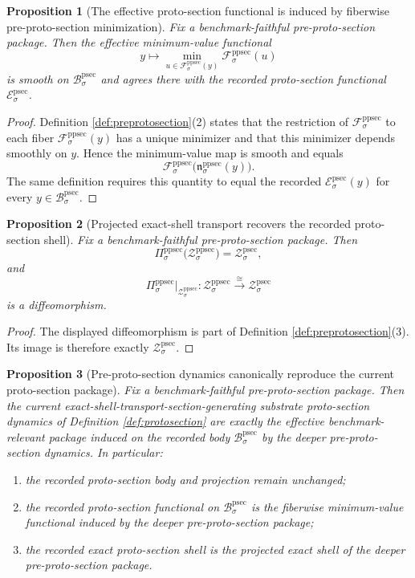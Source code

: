\documentclass[11pt]{article}
\newcommand{\ProtoSectionBody}[1]{\mathcal B_{#1}^{\mathrm{psec}}}
\newcommand{\ProtoSectionFunctional}[1]{\mathscr E_{#1}^{\mathrm{psec}}}
\newcommand{\ProtoSectionShell}[1]{\mathcal Z_{#1}^{\mathrm{psec}}}
\newcommand{\PreProtoSectionProj}[1]{\Pi_{#1}^{\mathrm{ppsec}}}
\newcommand{\PreProtoSectionFiber}[2]{\mathcal F_{#1}^{\mathrm{ppsec}}(#2)}
\newcommand{\PreProtoSectionProtoMin}[1]{\mathfrak n_{#1}^{\mathrm{ppsec}}}
\newcommand{\PreProtoSectionFunctional}[1]{\mathscr F_{#1}^{\mathrm{ppsec}}}
\newcommand{\PreProtoSectionShell}[1]{\mathcal Z_{#1}^{\mathrm{ppsec}}}
\newtheorem{proposition}{Proposition}
\begin{document}
\begin{proposition}[The effective proto-section functional is induced by fiberwise pre-proto-section minimization]
\label{prop:functional}
Fix a benchmark-faithful pre-proto-section package. Then the effective minimum-value functional
\[
y\longmapsto
\min_{u\in\PreProtoSectionFiber{\sigma}{y}}
\PreProtoSectionFunctional{\sigma}(u)
\]
is smooth on \(\ProtoSectionBody{\sigma}\) and agrees there with the recorded proto-section functional \(\ProtoSectionFunctional{\sigma}\).
\end{proposition}

\begin{proof}
Definition \ref{def:preprotosection}(2) states that the restriction of \(\PreProtoSectionFunctional{\sigma}\) to each fiber \(\PreProtoSectionFiber{\sigma}{y}\) has a unique minimizer and that this minimizer depends smoothly on \(y\). Hence the minimum-value map is smooth and equals
\[
\PreProtoSectionFunctional{\sigma}\bigl(\PreProtoSectionProtoMin{\sigma}(y)\bigr).
\]
The same definition requires this quantity to equal the recorded \(\ProtoSectionFunctional{\sigma}(y)\) for every \(y\in\ProtoSectionBody{\sigma}\).
\end{proof}

\begin{proposition}[Projected exact-shell transport recovers the recorded proto-section shell]
\label{prop:shell}
Fix a benchmark-faithful pre-proto-section package. Then
\[
\PreProtoSectionProj{\sigma}\bigl(\PreProtoSectionShell{\sigma}\bigr)
=
\ProtoSectionShell{\sigma},
\]
and
\[
\PreProtoSectionProj{\sigma}\big|_{\PreProtoSectionShell{\sigma}}
:
\PreProtoSectionShell{\sigma}\xrightarrow{\cong}\ProtoSectionShell{\sigma}
\]
is a diffeomorphism.
\end{proposition}

\begin{proof}
The displayed diffeomorphism is part of Definition \ref{def:preprotosection}(3). Its image is therefore exactly \(\ProtoSectionShell{\sigma}\).
\end{proof}

\begin{proposition}[Pre-proto-section dynamics canonically reproduce the current proto-section package]
\label{prop:package}
Fix a benchmark-faithful pre-proto-section package. Then the current exact-shell-transport-section-generating substrate proto-section dynamics of Definition \ref{def:protosection} are exactly the effective benchmark-relevant package induced on the recorded body \(\ProtoSectionBody{\sigma}\) by the deeper pre-proto-section dynamics. In particular:
\begin{enumerate}
    \item the recorded proto-section body and projection remain unchanged;
    \item the recorded proto-section functional on \(\ProtoSectionBody{\sigma}\) is the fiberwise minimum-value functional induced by the deeper pre-proto-section package;
    \item the recorded exact proto-section shell is the projected exact shell of the deeper pre-proto-section package.
\end{enumerate}
\end{proposition}
\end{document}
